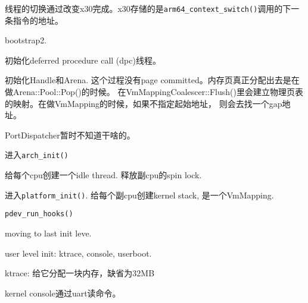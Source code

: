 线程的切换通过改变x30完成。x30存储的是\verb|arm64_context_switch()|调用的下一条指令的地址。

bootstrap2.

初始化deferred procedure call (dpc)线程。

初始化Handle和Arena. 这个过程没有page committed。内存页真正分配出去是在做Arena::Pool::Pop()的时候。
在VmMappingCoalescer::Flush()里会建立物理页表的映射。在做VmMapping的时候，如果不指定起始地址，
则会去找一个gap地址。

PortDispatcher暂时不知道干啥的。

进入\verb|arch_init()|

给每个cpu创建一个idle thread.  释放副cpu的spin lock.

进入\verb|platform_init()|. 给每个副cpu创建kernel stack, 是一个VmMapping.

\verb|pdev_run_hooks()|

moving to last init leve.

user level init: ktrace, console, userboot.

ktrace: 给它分配一块内存，缺省为32MB

kernel console通过uart读命令。















